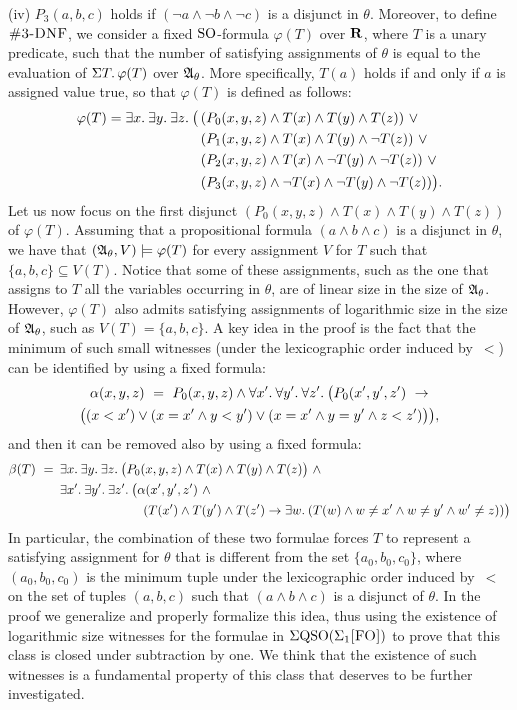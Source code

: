 (iv) $P_3(a,b,c)$ holds if $(\neg a \wedge \neg b \wedge \neg c)$ is a disjunct in $\theta$.
Moreover, to define $\ctdnf$, we consider a fixed ${\rm SO}$-formula $\varphi(T)$ over $\mathbf{R}$, where $T$ is a unary predicate, such that the number of satisfying assignments of $\theta$ is equal to the evaluation of $\Sigma{T}.\,\varphi(T)$ over $\mathfrak{A}_\theta$. More specifically, $T(a)$ holds if and only if  $a$ is assigned value true, so that $\varphi(T)$ is defined as follows:
\begin{align*}
\varphi(T) = \exists{x}.\:\exists{y}.\:\exists{z}.\:\big(\,
&(P_0(x,y,z)\wedge T(x)\wedge  T(y)\wedge T(z))\ \vee\\
&(P_1(x,y,z)\wedge T(x)\wedge  T(y)\wedge \neg T(z))\ \vee\\
&(P_2(x,y,z)\wedge T(x)\wedge \neg T(y)\wedge \neg T(z))\ \vee\\
&(P_3(x,y,z)\wedge \neg T(x)\wedge \neg T(y)\wedge \neg T(z))\big).
\end{align*}
Let us now focus on the first disjunct $(P_0(x,y,z)\wedge T(x)\wedge  T(y)\wedge T(z))$ of $\varphi(T)$. Assuming that a propositional formula $(a\wedge b \wedge c)$ is a disjunct in $\theta$, we have that $(\mathfrak{A}_\theta,V) \models \varphi(T)$ for every assignment $V$ for $T$ such that $\{a,b,c\} \subseteq V(T)$. 
Notice that some of these assignments, such as the one that assigns to $T$ all the variables occurring in $\theta$, are of linear size in the size of $\mathfrak{A}_\theta$. However, $\varphi(T)$ also admits satisfying assignments of logarithmic size in the size of $\mathfrak{A}_\theta$, such as $V(T) = \{a,b,c\}$. A key idea in the proof is the fact that the minimum of such small witnesses (under the lexicographic order induced by~$<$) can be identified by using a fixed formula:
\begin{multline*}
\alpha(x,y,z) \ = \ P_0(x,y,z) \wedge  \forall{x'}.\:\forall{y'}.\:\forall{z'}.\: \big(P_0(x',y',z')\ \to\\
\big((x < x') \vee (x = x' \wedge y < y') \vee (x = x' \wedge y = y' \wedge z < z')\big)\big),
\end{multline*}
and then it can be removed also by using a fixed formula:
\begin{align*}
\beta(T) \ = \ \, & \ex{x} \ex{y} \ex{z} \big(P_0(x,y,z)\wedge T(x)\wedge  T(y)\wedge T(z)\big)\ \wedge \\
& \ex{x'}\ex{y'}\ex{z'} \big(\alpha(x',y',z')\ \wedge \\
& \hspace{23mm} (T(x')\wedge T(y')\wedge T(z')\to \ex{w}(T(w) \wedge w \neq x' \wedge w\neq y' \wedge w'\neq z))\big)
\end{align*}
In particular, the combination of these two formulae forces $T$ to represent a satisfying assignment for $\theta$ that is different from the set $\{a_0,b_0,c_0\}$, where $(a_0,b_0,c_0)$ is the minimum tuple under the lexicographic order induced by~$<$ on the set of tuples $(a,b,c)$ such that $(a \wedge b \wedge c)$ is a disjunct of $\theta$. In the proof we generalize and properly formalize this idea, thus using the existence of logarithmic size witnesses for the formulae in $\Sigma{\rm QSO}(\Sigma_{1}\textsc{[FO]})$ to prove that this class is closed under subtraction by one. We think that the existence of such witnesses is a fundamental property of this class that deserves to be further investigated. 

